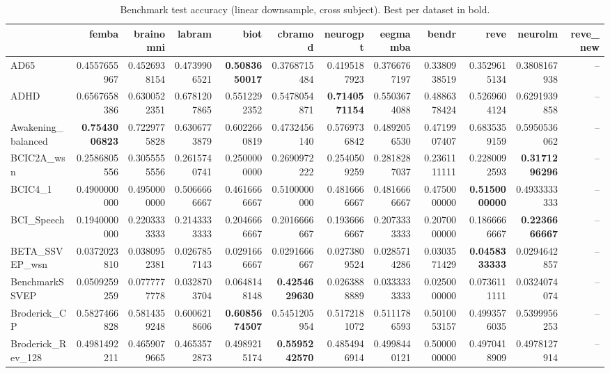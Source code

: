 \begin{table}[htbp]
\caption{Benchmark test accuracy (linear downsample, cross subject). Best per dataset in bold.}
\label{tab:benchmark_results_linear_downsample_cross_subject}
\begin{tabular}{lrrrrrrrrrrr}
\toprule
 & femba & brainomni & labram & biot & cbramod & neurogpt & eegmamba & bendr & reve & neurolm & reve_new \\
\midrule
AD65 & 0.4557655967 & 0.4526938154 & 0.4739906521 & \bfseries 0.5083650017 & 0.3768715484 & 0.4195187923 & 0.3766767197 & 0.3380938519 & 0.3529615134 & 0.3808167938 & -- \\
ADHD & 0.6567658386 & 0.6300522351 & 0.6781207865 & 0.5512292352 & 0.5478054871 & \bfseries 0.7140571154 & 0.5503674088 & 0.4886378424 & 0.5269604124 & 0.6291939858 & -- \\
Awakening_balanced & \bfseries 0.7543006823 & 0.7229775828 & 0.6306773879 & 0.6022660819 & 0.4732456140 & 0.5769736842 & 0.4892056530 & 0.4719907407 & 0.6835359159 & 0.5950536062 & -- \\
BCIC2A_wsn & 0.2586805556 & 0.3055555556 & 0.2615740741 & 0.2500000000 & 0.2690972222 & 0.2540509259 & 0.2818287037 & 0.2361111111 & 0.2280092593 & \bfseries 0.3171296296 & -- \\
BCIC4_1 & 0.4900000000 & 0.4950000000 & 0.5066666667 & 0.4616666667 & 0.5100000000 & 0.4816666667 & 0.4816666667 & 0.4750000000 & \bfseries 0.5150000000 & 0.4933333333 & -- \\
BCI_Speech & 0.1940000000 & 0.2203333333 & 0.2143333333 & 0.2046666667 & 0.2016666667 & 0.1936666667 & 0.2073333333 & 0.2070000000 & 0.1866666667 & \bfseries 0.2236666667 & -- \\
BETA_SSVEP_wsn & 0.0372023810 & 0.0380952381 & 0.0267857143 & 0.0291666667 & 0.0291666667 & 0.0273809524 & 0.0285714286 & 0.0303571429 & \bfseries 0.0458333333 & 0.0294642857 & -- \\
BenchmarkSSVEP & 0.0509259259 & 0.0777777778 & 0.0328703704 & 0.0648148148 & \bfseries 0.4254629630 & 0.0263888889 & 0.0333333333 & 0.0250000000 & 0.0736111111 & 0.0324074074 & -- \\
Broderick_CP & 0.5827466828 & 0.5814359248 & 0.6006218606 & \bfseries 0.6085674507 & 0.5451205954 & 0.5172181072 & 0.5111786593 & 0.5010053157 & 0.4993576035 & 0.5399956253 & -- \\
Broderick_Rev_128 & 0.4981492211 & 0.4659079665 & 0.4653572873 & 0.4989215174 & \bfseries 0.5595242570 & 0.4854946914 & 0.4998440121 & 0.5000000000 & 0.4970418909 & 0.4978127914 & -- \\

\end{tabular}
\end{table}
